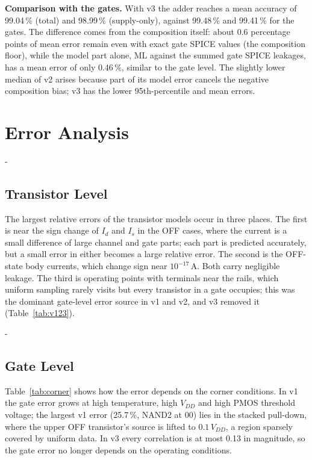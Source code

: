\documentclass[12pt, a4paper]{article}
\makeatletter
\newcommand{\keepspace}[1]{\par\begingroup
  \setlength{\dimen@}{#1}%
  \dimen@ii\pagegoal \advance\dimen@ii-\pagetotal
  \ifdim\dimen@>\dimen@ii
    \ifdim\dimen@ii>\z@ \vfil\fi
    \break
  \fi\endgroup}
\makeatother
\begin{document}
\noindent\textbf{Comparison with the gates.} With v3 the adder reaches a mean accuracy of 99.04\,\% (total) and 98.99\,\% (supply-only), against 99.48\,\% and 99.41\,\% for the gates. The difference comes from the composition itself: about 0.6 percentage points of mean error remain even with exact gate SPICE values (the composition floor), while the model part alone, ML against the summed gate SPICE leakages, has a mean error of only 0.46\,\%, similar to the gate level. The slightly lower median of v2 arises because part of its model error cancels the negative composition bias; v3 has the lower 95th-percentile and mean errors.

\newpage
{}
\section{Error Analysis}
\label{sec:errors}

\keepspace{14\baselineskip}
\subsection{Transistor Level}
\noindent The largest relative errors of the transistor models occur in three places. The first is near the sign change of $I_d$ and $I_s$ in the OFF cases, where the current is a small difference of large channel and gate parts; each part is predicted accurately, but a small error in either becomes a large relative error. The second is the OFF-state body currents, which change sign near $10^{-17}$\,A. Both carry negligible leakage. The third is operating points with terminals near the rails, which uniform sampling rarely visits but every transistor in a gate occupies; this was the dominant gate-level error source in v1 and v2, and v3 removed it (Table~\ref{tab:v123}).

\keepspace{263pt}
\subsection{Gate Level}
\noindent Table~\ref{tab:corner} shows how the error depends on the corner conditions. In v1 the gate error grows at high temperature, high $V_{DD}$ and high PMOS threshold voltage; the largest v1 error (25.7\,\%, NAND2 at 00) lies in the stacked pull-down, where the upper OFF transistor's source is lifted to $0.1\,V_{DD}$, a region sparsely covered by uniform data. In v3 every correlation is at most 0.13 in magnitude, so the gate error no longer depends on the operating conditions.
\end{document}
